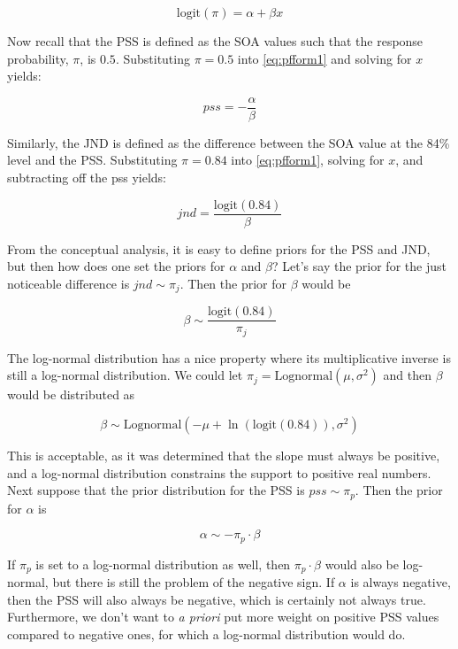 \documentclass[11pt, oneside, openany]{scrbook}
\begin{document}
\begin{equation}
  \mathrm{logit}(\pi) = \alpha+\beta x
  \label{eq:pfform1}
\end{equation}

Now recall that the PSS is defined as the SOA values such that the response probability, \(\pi\), is \(0.5\). Substituting \(\pi = 0.5\) into \eqref{eq:pfform1} and solving for \(x\) yields:

\[pss = -\frac{\alpha}{\beta}\]

Similarly, the JND is defined as the difference between the SOA value at the 84\% level and the PSS. Substituting \(\pi = 0.84\) into \eqref{eq:pfform1}, solving for \(x\), and subtracting off the pss yields:

\begin{equation}
  jnd = \frac{\mathrm{logit}(0.84)}{\beta}
  \label{eq:jnd1}
\end{equation}

From the conceptual analysis, it is easy to define priors for the PSS and JND, but then how does one set the priors for \(\alpha\) and \(\beta\)? Let's say the prior for the just noticeable difference is \(jnd \sim \pi_j\). Then the prior for \(\beta\) would be

\[\beta \sim \frac{\mathrm{logit}(0.84)}{\pi_j}\]

The log-normal distribution has a nice property where its multiplicative inverse is still a log-normal distribution. We could let \(\pi_j = \mathrm{Lognormal}(\mu, \sigma^2)\) and then \(\beta\) would be distributed as

\[
\beta \sim \mathrm{Lognormal}(-\mu + \ln(\mathrm{logit}(0.84)), \sigma^2)
\]

This is acceptable, as it was determined that the slope must always be positive, and a log-normal distribution constrains the support to positive real numbers. Next suppose that the prior distribution for the PSS is \(pss \sim \pi_p\). Then the prior for \(\alpha\) is

\[\alpha \sim -\pi_p \cdot \beta\]

If \(\pi_p\) is set to a log-normal distribution as well, then \(\pi_p \cdot \beta\) would also be log-normal, but there is still the problem of the negative sign. If \(\alpha\) is always negative, then the PSS will also always be negative, which is certainly not always true. Furthermore, we don't want to \emph{a priori} put more weight on positive PSS values compared to negative ones, for which a log-normal distribution would do.
\end{document}

